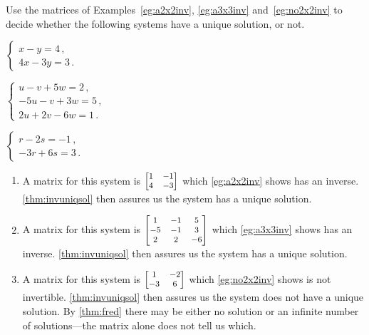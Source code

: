 \begin{example} \label{eg:}
Use the matrices of Examples~\ref{eg:a2x2inv}, \ref{eg:a3x3inv} and~\ref{eg:no2x2inv} to decide whether the following systems have a unique solution, or not.
\begin{parts}
\item \(\begin{cases}
x-y=4\,,\\4x-3y=3\,.
\end{cases}\)
\item \(\begin{cases}
u-v+5w=2\,,\\ -5u-v+3w=5\,,\\ 2u+2v-6w=1\,.
\end{cases}\)
\item \(\begin{cases}
r-2s=-1\,,\\-3r+6s=3\,.
\end{cases}\)
\end{parts}
\begin{solution} 
\begin{enumerate}
\item A matrix for this system is \(\footnotesize\begin{bmatrix} 1&-1\\4&-3 \end{bmatrix}\) which \autoref{eg:a2x2inv} shows has an inverse.  
\autoref{thm:invuniqsol} then assures us the system has a unique solution.
\item A matrix for this system is \(\footnotesize\begin{bmatrix} 1&-1&5\\-5&-1&3\\2&2&-6 \end{bmatrix}\) which \autoref{eg:a3x3inv} shows has an inverse.  
\autoref{thm:invuniqsol} then assures us the system has a unique solution.
\item A matrix for this system is \(\footnotesize\begin{bmatrix} 1&-2\\-3&6 \end{bmatrix}\) which \autoref{eg:no2x2inv} shows is not invertible.  
\autoref{thm:invuniqsol} then assures us the system does not have a unique solution.
By \autoref{thm:fred} there may be either no solution or an infinite number of solutions---the matrix alone does not tell us which.
\end{enumerate}
\end{solution}
\end{example}






